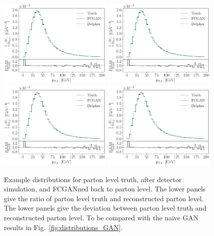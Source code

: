 \begin{figure}[t]
\centering
\includegraphics[page = 2, width=0.49\textwidth]{figures/cGAN/cGAN_full_ratio}
\includegraphics[page = 3, width=0.49\textwidth]{figures/cGAN/cGAN_full_ratio} \\
\includegraphics[page = 1, width=0.49\textwidth]{figures/cGAN/cGAN_full_ratio}
\includegraphics[page = 4, width=0.49\textwidth]{figures/cGAN/cGAN_full_ratio}
\caption{Example distributions for parton level truth, after detector
  simulation, and FCGANned back to parton level. The lower panels give
  the ratio of parton level truth and reconstructed parton level.  The
  lower panels give the deviation between parton level truth and
  reconstructed parton level. To be compared with the naive GAN
  results in Fig.~\ref{fig:distributions_GAN}.}
\label{fig:distributions_FCGAN}
\end{figure}

